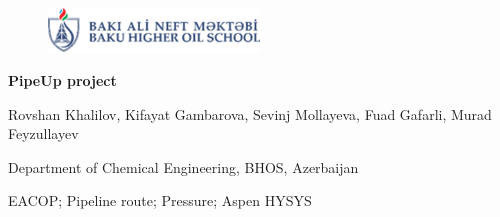 \documentclass[12pt]{article}
\begin{document}
\begin{center}


	\begin{figure}[h!]
		\centering
		\includegraphics[width=0.5\textwidth]{assets/images/banm.png}
		
	 \end{figure}


	
{\fontsize{14pt}{14pt}\selectfont

\textbf{PipeUp project}

}	

\end{center}

Rovshan Khalilov,
Kifayat Gambarova, 
Sevinj Mollayeva,
Fuad Gafarli,
Murad Feyzullayev

\begin{center}
	Department of Chemical Engineering, BHOS, Azerbaijan

	EACOP; Pipeline route; Pressure; Aspen HYSYS
\end{center}
\newpage
\tableofcontents
\newpage
\end{document}
